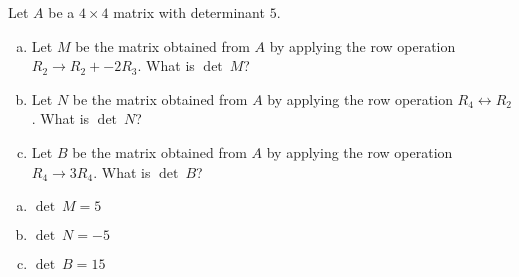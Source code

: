 
\begin{exerciseStatement}


Let \(A\) be a \(4 \times 4\) matrix with determinant \( 5 \).


\begin{enumerate}[(a)]
\item Let \(M\) be the matrix obtained from \(A\) by applying the row operation \( R_2 \to R_2 + -2R_3 \). What is \(\operatorname{det}\ M\)?
\item Let \(N\) be the matrix obtained from \(A\) by applying the row operation \( R_4 \leftrightarrow R_2 \). What is \(\operatorname{det}\ N\)?
\item Let \(B\) be the matrix obtained from \(A\) by applying the row operation \( R_4 \to 3R_4 \). What is \(\operatorname{det}\ B\)?
\end{enumerate}
    
\end{exerciseStatement}
    
\begin{exerciseAnswer} 

\begin{enumerate}[(a)]
\item \(\operatorname{det}\ M= 5 \)
\item \(\operatorname{det}\ N= -5 \)
\item \(\operatorname{det}\ B= 15 \)
\end{enumerate}
    
\end{exerciseAnswer}
    
